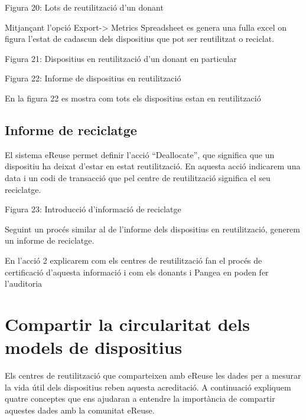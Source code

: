 \documentclass[
]{book}
\begin{document}
Figura 20: Lots de reutilització d'un donant

Mitjançant l'opció Export-\textgreater{} Metrics Spreadsheet es genera una fulla excel on figura l'estat de cadascun dels dispositius que pot ser reutilitzat o reciclat.

Figura 21: Dispositius en reutilització d'un donant en particular

Figura 22: Informe de dispositius en reutilització

En la figura 22 es mostra com tots els dispositius estan en reutilització

\hypertarget{informe-de-reciclatge}{%
\subsection{Informe de reciclatge}\label{informe-de-reciclatge}}

El sistema eReuse permet definir l'acció ``Deallocate'', que significa que un dispositiu ha deixat d'estar en estat reutilització. En aquesta acció indicarem una data i un codi de transacció que pel centre de reutilització significa el seu reciclatge.

Figura 23: Introducció d'informació de reciclatge

Seguint un procés similar al de l'informe dels dispositius en reutilització, generem un informe de reciclatge.

En l'acció 2 explicarem com els centres de reutilització fan el procés de certificació d'aquesta informació i com els donants i Pangea en poden fer l'auditoria

\hypertarget{compartir-la-circularitat-dels-models-de-dispositius}{%
\section{Compartir la circularitat dels models de dispositius}\label{compartir-la-circularitat-dels-models-de-dispositius}}

Els centres de reutilització que comparteixen amb eReuse les dades per a mesurar la vida útil dels dispositius reben aquesta acreditació. A continuació expliquem quatre conceptes que ens ajudaran a entendre la importància de compartir aquestes dades amb la comunitat eReuse.
\end{document}
